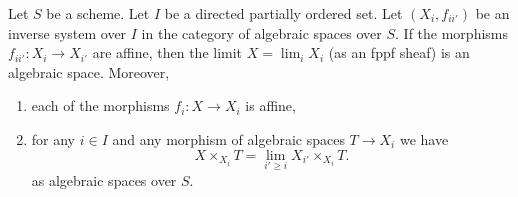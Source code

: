 \begin{lemma}
\label{lemma-directed-inverse-system-has-limit}
Let $S$ be a scheme. Let $I$ be a directed partially ordered set.
Let $(X_i, f_{ii'})$ be an inverse system over $I$
in the category of algebraic spaces over $S$.
If the morphisms $f_{ii'} : X_i \to X_{i'}$ are affine, then the
limit $X = \lim_i X_i$ (as an fppf sheaf) is an algebraic space.
Moreover,
\begin{enumerate}
\item each of the morphisms $f_i : X \to X_i$ is affine,
\item for any $i \in I$ and any morphism of algebraic spaces
$T \to X_i$ we have
$$
X \times_{X_i} T = \lim_{i' \geq i} X_{i'} \times_{X_i} T.
$$
as algebraic spaces over $S$.
\end{enumerate}
\end{lemma}

